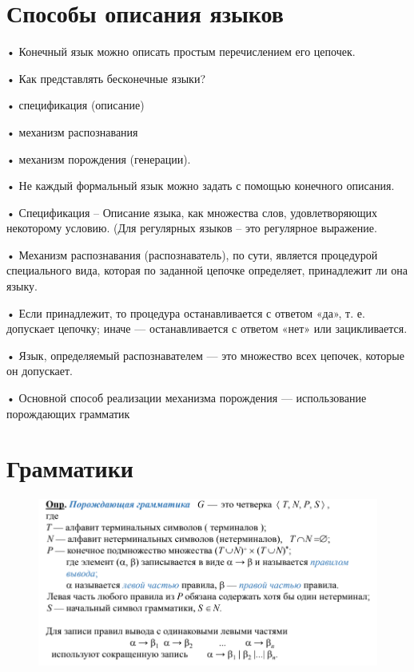 \documentclass{article}
\begin{document}
\section{Способы описания языков}

• Конечный язык можно описать простым перечислением его
цепочек.

• Как представлять бесконечные языки?

• спецификация (описание)

• механизм распознавания

• механизм порождения (генерации).

• Не каждый формальный язык можно задать с помощью конечного
описания.


• Спецификация – Описание языка, как множества слов,
удовлетворяющих некоторому условию. (Для регулярных языков – это
регулярное выражение.

• Механизм распознавания (распознаватель), по сути, является
процедурой специального вида, которая по заданной цепочке
определяет, принадлежит ли она языку.

• Если принадлежит, то процедура останавливается с ответом «да», т. е.
допускает цепочку; иначе — останавливается с ответом «нет» или
зацикливается.

• Язык, определяемый распознавателем — это множество всех
цепочек, которые он допускает.

• Основной способ реализации механизма порождения —
использование порождающих грамматик

\section{Грамматики}

\begin{figure}[H]
    \centering
    \includegraphics[width=1\linewidth]{Снимок экрана 2025-02-20 084954.png}
\end{figure}
\end{document}
